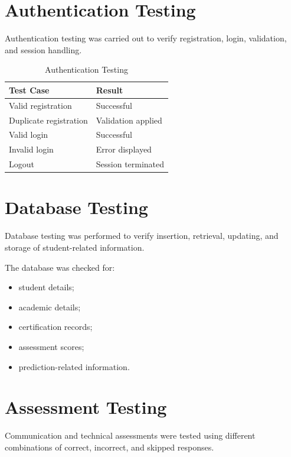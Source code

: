 \documentclass[12pt,a4paper]{report}
\begin{document}
\section{Authentication Testing}

Authentication testing was carried out to verify registration,
login, validation, and session handling.

\begin{table}[H]
\centering
\caption{Authentication Testing}

\begin{tabularx}{\textwidth}{p{}Y}
\toprule
\textbf{Test Case} & \textbf{Result} \\
\midrule
Valid registration & Successful \\
Duplicate registration & Validation applied \\
Valid login & Successful \\
Invalid login & Error displayed \\
Logout & Session terminated \\
\bottomrule
\end{tabularx}
\end{table}

\section{Database Testing}

Database testing was performed to verify insertion, retrieval,
updating, and storage of student-related information.

The database was checked for:

\begin{itemize}
    \item student details;
    \item academic details;
    \item certification records;
    \item assessment scores;
    \item prediction-related information.
\end{itemize}

\section{Assessment Testing}

Communication and technical assessments were tested using
different combinations of correct, incorrect, and skipped
responses.
\end{document}
